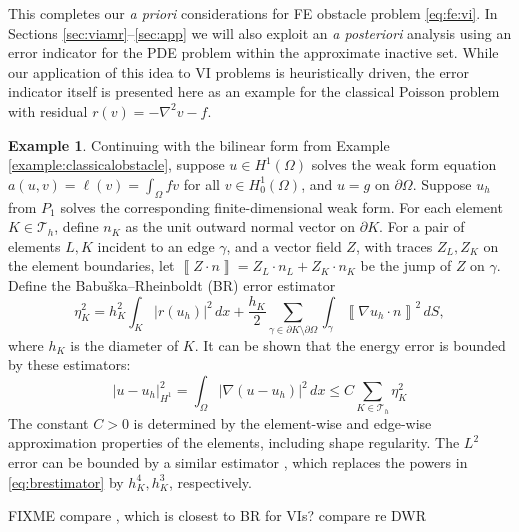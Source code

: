 \documentclass[]{interact}
\theoremstyle{plain}%
\theoremstyle{definition}
\newtheorem{example}[theorem]{Example}
\theoremstyle{remark}
\newcommand{\grad}{\nabla}
\newcommand{\cT}{\mathcal{T}}
\begin{document}
This completes our \emph{a priori} considerations for FE obstacle problem \eqref{eq:fe:vi}.  In Sections \ref{sec:viamr}--\ref{sec:app} we will also exploit an \emph{a posteriori} analysis using an error indicator for the PDE problem within the approximate inactive set.  While our application of this idea to VI problems is heuristically driven, the error indicator itself is presented here as an example for the classical Poisson problem with residual $r(v)=-\nabla^2 v - f$.

\begin{example}  \label{example:br}
Continuing with the bilinear form from Example \ref{example:classicalobstacle}, suppose $u \in H^1(\Omega)$ solves the weak form equation $a(u,v) = \ell(v) = \int_\Omega f v$ for all $v \in H^1_0(\Omega)$, and $u=g$ on $\partial \Omega$.  Suppose $u_h$ from $P_1$ solves the corresponding finite-dimensional weak form.  For each element $K \in \cT_h$, define $n_K$ as the unit outward normal vector on $\partial K$.  For a pair of elements $L,K$ incident to an edge $\gamma$, and a vector field $Z$, with traces $Z_L,Z_K$ on the element boundaries, let $\left\llbracket Z \cdot n \right\rrbracket = Z_L \cdot n_L + Z_K \cdot n_K$ be the jump of $Z$ on $\gamma$.  Define the Babu\v{s}ka--Rheinboldt (BR) \cite{BabuskaRheinboldt1979} error estimator
\begin{equation} \label{eq:brestimator}
\eta_K^2 = h_K^2 \int_K |r(u_h)|^2\,dx + \frac{h_K}{2} \sum_{\gamma \in \partial K \setminus \partial \Omega} \int_{\gamma} \left\llbracket \grad u_h \cdot n \right\rrbracket^2\,dS,
\end{equation}
where $h_K$ is the diameter of $K$.  It can be shown \cite[Chapter 2]{AinsworthOden2000} that the energy error is bounded by these estimators:
\begin{equation} \label{eq:brbound}
|u-u_h|_{H^1}^2 = \int_\Omega |\grad(u-u_h)|^2\,dx \le C \sum_{K\in\cT_h} \eta_K^2
\end{equation}
The constant $C>0$ is determined by the element-wise and edge-wise approximation properties of the elements, including shape regularity.  The $L^2$ error can be bounded by a similar estimator \cite[section 2.4]{AinsworthOden2000}, which replaces the powers in \eqref{eq:brestimator} by $h_K^4,h_K^3$, respectively.
\end{example}

FIXME compare \cite{AinsworthOdenLee1993}, which is closest to BR for VIs?  compare \cite{Suttmeier2008} re DWR

\end{document}
